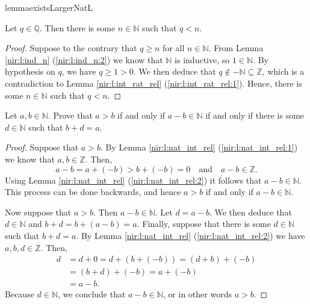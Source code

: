 \Newpage
\begin{restatable}{lemma}{existsLargerNatL} %
	\label{nir:l:exists_larger_nat}

	Let $q \in \mathbb{Q}$. Then there is some $n \in \mathbb{N}$ such that $q < n$.
\end{restatable}

\begin{proof}
	Suppose to the contrary that $q \geq n$ for all $n \in \mathbb{N}$. From Lemma \ref{nir:l:ind_n} (\ref{nir:l:ind_n:2}) we know that $\mathbb{N}$ is inductive, so $1 \in \mathbb{N}$. By hypothesis on $q$, we have $q \geq 1 > 0$. We then deduce that $q \notin - \mathbb{N} \subseteq \mathbb{Z}$, which is a contradiction to Lemma \ref{nir:l:int_rat_rel} (\ref{nir:l:int_rat_rel:1}). Hence, there is some $n \in \mathbb{N}$ such that $q < n$.
\end{proof}


\Newpage
\begin{exercise} %
	Let $a, b \in \mathbb{N}$. Prove that $a > b$ if and only if $a - b \in \mathbb{N}$ if and only if there is some $d \in \mathbb{N}$ such that $b + d = a$.
\end{exercise}

\begin{proof}
	Suppose that $a > b$. By Lemma \ref{nir:l:nat_int_rel} (\ref{nir:l:nat_int_rel:1}) we know that $a, b \in \mathbb{Z}$. Then,
	$$
		a - b = a + (-b) > b + (-b) = 0 \quad \text{and} \quad a - b \in \mathbb{Z}.
	$$
	Using Lemma \ref{nir:l:nat_int_rel} (\ref{nir:l:nat_int_rel:2}) it follows that $a - b \in \mathbb{N}$. This process can be done backwards, and hence $a > b$ if and only if $a - b \in \mathbb{N}$.

	Now suppose that $a > b$. Then $a - b \in \mathbb{N}$. Let $d = a - b$. We then deduce that $d \in \mathbb{N}$ and $b + d = b + (a - b) = a$. Finally, suppose that there is some $d \in \mathbb{N}$ such that $b + d = a$. By Lemma \ref{nir:l:nat_int_rel} (\ref{nir:l:nat_int_rel:2}) we have $a, b, d \in \mathbb{Z}$. Then,
	\begin{align*}
		d & = d + 0 = d + (b + (-b)) = (d + b) + (-b) \\
		  & = (b + d) + (-b) = a + (-b)               \\
		  & = a - b.
	\end{align*}
	Because $d \in \mathbb{N}$, we conclude that $a - b \in \mathbb{N}$, or in other words $a > b$.
\end{proof}


